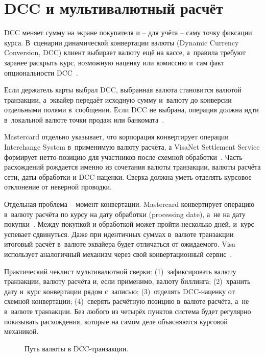 \section{DCC и мультивалютный расчёт}\label{sec:recon-dcc}

DCC меняет сумму на экране покупателя и -- для учёта -- саму точку
фиксации курса. В~сценарии
динамической конвертации валюты (Dynamic Currency Conversion, DCC)
клиент выбирает валюту ещё на кассе, а~правила требуют заранее
раскрыть курс, возможную наценку или комиссию и~сам факт
опциональности DCC~\cite{visa-core-rules,mc-tpr}.

Если держатель карты
выбрал DCC, выбранная валюта становится валютой транзакции, а~эквайер
передаёт исходную сумму и~валюту до конверсии отдельными полями в~сообщении.
Если DCC не выбрана, операция должна идти в~локальной валюте точки
продаж или банкомата~\cite{visa-core-rules,mc-tpr}.

Mastercard отдельно указывает,
что корпорация конвертирует операции Interchange System в~применимую
валюту расчёта, а VisaNet Settlement Service формирует нетто-позицию
для участников после схемной обработки~\cite{mc-rules,visa-core-rules}.
Часть расхождений рождается именно из сочетания валюты транзакции,
валюты расчёта сети, даты обработки и DCC-наценки.
Сверка должна уметь отделять курсовое отклонение от
неверной проводки.

Отдельная проблема -- момент конвертации. Mastercard конвертирует
операцию в~валюту расчёта по курсу на дату обработки (processing
date), а~не на дату покупки~\cite{mc-rules}. Между покупкой и
обработкой может пройти несколько дней, и~курс успевает сдвинуться.
Даже при идентичных суммах в~валюте транзакции итоговый расчёт
в~валюте эквайера будет отличаться от ожидаемого. Visa использует
аналогичный механизм через свой конвертационный сервис~\cite{visa-core-rules}.

Практический чеклист мультивалютной сверки: (1)~зафиксировать
валюту транзакции, валюту расчёта и, если применимо, валюту
биллинга; (2)~хранить дату и~курс конвертации рядом с~записью;
(3)~отделять DCC-наценку от схемной конвертации; (4)~сверять
расчётную позицию в~валюте расчёта, а~не в~валюте транзакции.
Без любого из четырёх пунктов система будет регулярно показывать
расхождения, которые на самом деле объясняются курсовой механикой.

\begin{figure}[tbp]
  \centering
  \caption{Путь валюты в DCC-транзакции.}\label{fig:dcc-currency-flow}
\end{figure}

